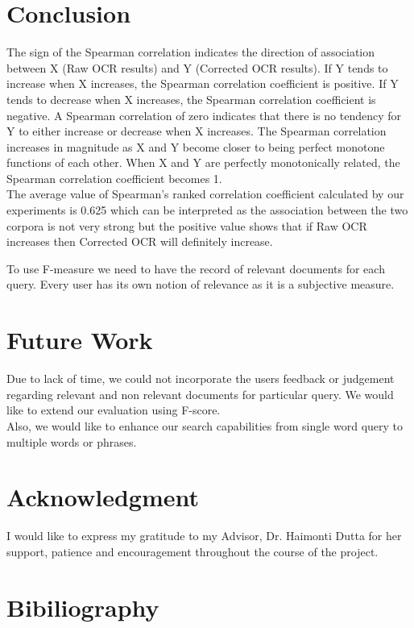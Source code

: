 \section{Conclusion}
The sign of the Spearman correlation indicates the direction of association between X (Raw OCR results) and Y (Corrected OCR results). If Y tends to increase when X increases, the Spearman correlation coefficient is positive. If Y tends to decrease when X increases, the Spearman correlation coefficient is negative. A Spearman correlation of zero indicates that there is no tendency for Y to either increase or decrease when X increases. The Spearman correlation increases in magnitude as X and Y become closer to being perfect monotone functions of each other. When X and Y are perfectly monotonically related, the Spearman correlation coefficient becomes 1. \\
The average value of Spearman's ranked correlation coefficient calculated by our experiments is 0.625 which can be interpreted as the association between the two corpora is not very strong but the positive value shows that if Raw OCR increases then Corrected OCR will definitely increase.

To use F-measure we need to have the record of relevant documents for each query. Every user has its own notion of relevance as it is a subjective measure.\\



\section{Future Work}
Due to lack of time, we could not incorporate the users feedback or judgement regarding relevant and non relevant documents for particular query. We would like to extend our evaluation using F-score. \\
Also, we would like to enhance our search capabilities from single word query to multiple words or phrases. \\


\section*{Acknowledgment}
I would like to express my gratitude to my Advisor, Dr. Haimonti Dutta for her support, patience and encouragement throughout the course of the project. \\

\nocite{datasource,cdnc,digital}

\section{Bibiliography}






